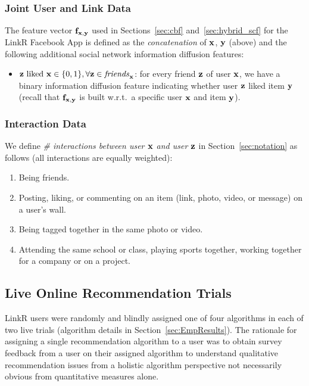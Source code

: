 \subsubsection{Joint User and Link Data}

\label{sec:fxy_def}

The feature vector $\mathbf{f}_{\mathbf{x},\mathbf{y}}$ used in Sections~\ref{sec:cbf}
and~\ref{sec:hybrid_scf} for the LinkR Facebook App is defined as the
\emph{concatenation} of $\mathbf{x}$, $\mathbf{y}$ (above) and the following
additional social network information diffusion features:
\begin{itemize}
\item $\mbox{$\mathbf{z}$ liked $\mathbf{x}$} \in \{0, 1\}, \forall \mathbf{z} \in \mathit{friends}_{\mathbf{x}}$: for every friend $\mathbf{z}$ of user $\mathbf{x}$, we have a binary information diffusion  feature indicating whether user $\mathbf{z}$ liked item $\mathbf{y}$ (recall that $\mathbf{f}_{\mathbf{x},\mathbf{y}}$ is built w.r.t.\ a specific user $\mathbf{x}$ and item $\mathbf{y}$).
\end{itemize}

\subsubsection{Interaction Data}
\label{sec:interactions}

We define \emph{\# interactions between user $\mathbf{x}$ and user $\mathbf{z}$} in 
Section~\ref{sec:notation} as follows (all interactions are equally weighted):
\begin{enumerate}
\item{Being friends.}
\item{Posting, liking, or commenting on an item (link, photo, video, or message) on a user's wall.}
\item{Being tagged together in the same photo or video.}
\item{Attending the same school or class, playing sports together, working together for a company or on a project.}
\end{enumerate}

\subsection{Live Online Recommendation Trials}

LinkR users were randomly and blindly assigned one of four algorithms
in each of two live trials (algorithm details in
Section~\ref{sec:EmpResults}).  The rationale for assigning
a single recommendation algorithm to a user was to obtain survey
feedback from a user on their assigned algorithm to understand
qualitative recommendation issues from a holistic algorithm
perspective not necessarily obvious from quantitative measures alone.

